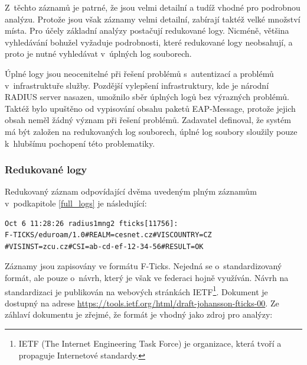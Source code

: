 \documentclass[thesis=M,czech]{FITthesis}[2012/06/26]
\begin{document}
    Z~těchto záznamů je patrné, že jsou velmi detailní a tudíž vhodné pro podrobnou analýzu. 
    Protože jsou však záznamy velmi detailní, zabírají taktéž velké množství místa.
    Pro účely základní analýzy postačují redukované logy.
    Nicméně, většina vyhledávání bohužel vyžaduje podrobnosti, které redukované logy neobsahují, 
    a proto je nutné vyhledávat v~úplných log souborech.

    Úplné logy jsou neocenitelné při řešení problémů s~autentizací a problémů v~infrastruktuře služby.
    Pozdější vylepšení infrastruktury, kde je národní RADIUS server nasazen,
    umožnilo sběr úplných logů bez výrazných problémů.
    Taktéž bylo upuštěno od vypisování obsahu paketů EAP-Message,
    protože jejich obsah neměl žádný význam při řešení problémů.
    Zadavatel definoval, že systém má být založen na redukovaných log souborech,
    úplné log soubory sloužily pouze k~hlubšímu pochopení této problematiky.

  \subsubsection{Redukované logy}
  \label{reduced_logs}

    Redukovaný záznam odpovídající dvěma uvedeným plným záznamům v~podkapitole \ref{full_logs} je následující:

    \begin{verbatim}
Oct 6 11:28:26 radius1mng2 fticks[11756]:
F-TICKS/eduroam/1.0#REALM=cesnet.cz#VISCOUNTRY=CZ
#VISINST=zcu.cz#CSI=ab-cd-ef-12-34-56#RESULT=OK
    \end{verbatim}

    Záznamy jsou zapisovány ve formátu F-Ticks. Nejedná se o~standardizovaný formát,
    ale pouze o~návrh, který je však ve federaci hojně využíván. \cite{monitor_eduroam}
    Návrh na standardizaci je publikován na webových
    stránkách IETF\footnote{
      IETF (The Internet Engineering Task Force) je organizace, která tvoří a propaguje Internetové standardy.
    }.
    Dokument je dostupný na adrese 
    \href{https://tools.ietf.org/html/draft-johansson-fticks-00}{https://tools.ietf.org/html/draft-johansson-fticks-00}.
    Ze záhlaví dokumentu je zřejmé, že formát je vhodný jako zdroj pro analýzy:
    \cite{fticks_draft}
\end{document}
